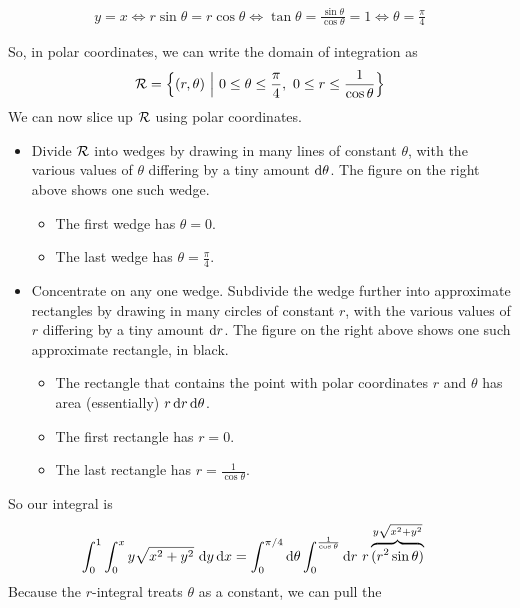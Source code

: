 \begin{eg}
\begin{itemize}
\begin{align*}
y=x
\iff
r\sin\theta = r\cos\theta
\iff
\tan\theta=\frac{\sin\theta}{\cos\theta}=1
\iff
\theta=\frac{\pi}{4}
\end{align*}
\end{itemize}
So, in polar coordinates, we can write the domain of integration as
\begin{equation*}
\cR=\Big\{(r,\theta)\ \Big|\ 0\le\theta\le\frac{\pi}{4},\ 
             0\le r\le \frac{1}{\cos\theta}\Big\}
\end{equation*}
We can now slice up $\mathcal{R}$ using polar coordinates.
\begin{itemize}
\item
Divide $\mathcal{R}$ into wedges by drawing in many lines of constant 
$\theta$, with the various values of $\theta$ differing by a tiny 
amount $\mathrm{d}\theta$. The figure on the right above shows one such wedge.
\vspace{-\topsep}
\begin{itemize} \itemsep1pt \parskip0pt 
\item
The first wedge has $\theta=0$.
\item
The last wedge has $\theta=\frac{\pi}{4}$.
\end{itemize}
\vspace{-\topsep}
\item
Concentrate on any one wedge. Subdivide the wedge further into
approximate rectangles by drawing in many circles of constant $r$, 
with the various values of $r$ differing by a tiny amount $\mathrm{d}r$.
The figure on the right above shows one such approximate rectangle, in black.
\vspace{-\topsep}
\begin{itemize} \itemsep1pt \parskip0pt 
\item
The rectangle that contains the point with polar coordinates $r$ and 
$\theta$ has area (essentially) $r\,\mathrm{d}r\,\mathrm{d}\theta$.
\item
The first rectangle has $r=0$.
\item
The last rectangle has $r=\frac{1}{\cos\theta}$.
\end{itemize}
\vspace{-\topsep}
\end{itemize}
So our integral is
\begin{align*}
\int_0^1\int_0^x y\sqrt{x^2+y^2}\ \dee{y}\,\dee{x}
&=\int_0^{\pi/4}\dee{\theta}\int_0^{\frac{1}{\cos\theta}}\dee{r}\ 
     r\overbrace{(r^2\sin\theta)}^{y\sqrt{x^2+y^2}}
\end{align*}
Because the $r$-integral treats $\theta$ as a constant, we can pull the

\end{eg}
